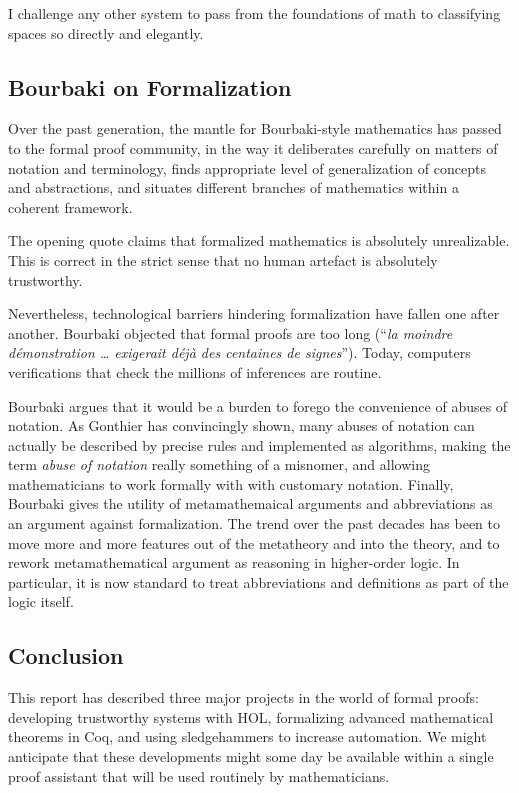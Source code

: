 \documentclass[brochure,english,12pt]{bourbaki}
\theoremstyle{plain}
\begin{document}
I challenge any other system to pass from the foundations of math to classifying spaces so directly and elegantly.




\subsection{Bourbaki on Formalization}

Over the past generation, the mantle for Bourbaki-style mathematics has  passed to the formal proof community, in the way it
 deliberates carefully on matters of notation and terminology, finds
appropriate level of generalization of concepts and abstractions, and
situates different branches of mathematics within a coherent framework.

The opening quote claims that formalized mathematics is absolutely unrealizable.
This is correct in the strict sense that no human artefact is absolutely trustworthy.

Nevertheless,  technological barriers hindering formalization have fallen one
after another.  Bourbaki objected that formal proofs are too long (``{\it la moindre d\'emonstration \ldots
exigerait d\'ej\`a des centaines de signes}''). Today, computers verifications that
check the millions of inferences are routine.

Bourbaki argues that it would be a burden to forego the convenience of abuses of notation.
As Gonthier has convincingly shown, 
many abuses of notation can actually be described by precise rules and implemented as algorithms,
making the term {\it abuse of notation} really something of a misnomer, and
allowing mathematicians to work formally with with customary notation.
Finally, Bourbaki gives the utility of metamathemaical arguments and abbreviations as an argument against formalization.
The trend over the past decades has been to move more and more features out of the metatheory and into the theory, and to
rework metamathematical argument as reasoning in higher-order logic.  In particular, it is now
standard to treat abbreviations and definitions as part of the logic itself.

\subsection{Conclusion}

This report has described three major projects in the world of formal proofs:
developing trustworthy systems with HOL, formalizing advanced mathematical theorems
in Coq, and using sledgehammers to increase automation.  
We might anticipate that these developments might some day be available within a single proof assistant
that will be used routinely by mathematicians.
\end{document}
